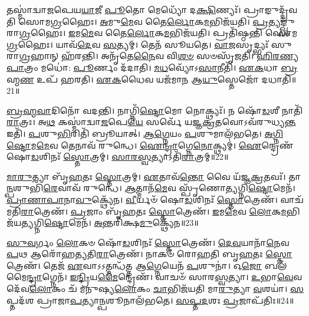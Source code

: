 𑌤𑌸𑍍𑌮𑌾॑𑌦𑍍𑌵𑌾𑌜𑌪𑍇𑌯\-\ul{𑌯𑌾}\-𑌜𑍀 \ul{𑌪𑍂}\-𑌤𑍋 𑌮𑍇𑌧𑍍𑌯𑍋᳴ 𑌦\-\ul{𑌕𑍍𑌷𑌿}\-𑌣𑍍𑌯𑌃᳴।
𑌪𑍍𑌰𑌾𑌙𑍁𑌦𑍍𑌦𑍍𑌰᳴𑌵𑌤𑌿 𑌸𑍋𑌮\-\ul{𑌗𑍍𑌰}\-𑌹𑍈𑌃।
\-\ul{𑌅}\-𑌮𑍁\-\ul{𑌮𑍇}\-𑌵 𑌤𑍈\-\ul{𑌰𑍍𑌲𑍋}\-𑌕\-\ul{𑌮}\-𑌭𑌿𑌜᳴𑌯𑌤𑌿।
\-\ul{𑌪𑍍𑌰}\-𑌤𑍍𑌯𑌙𑍍𑌖𑍍𑌸𑍁᳴𑌰𑌾\-\ul{𑌗𑍍𑌰}\-𑌹𑍈𑌃।
\-\ul{𑌇}\-𑌮\-\ul{𑌮𑍇}\-𑌵 𑌤𑍈\-\ul{𑌰𑍍𑌲𑍋}\-𑌕\-\ul{𑌮}\-𑌭𑌿𑌜᳴𑌯𑌤𑌿।
𑌪𑍍𑌰𑌤𑌿᳴\-𑌷𑍍𑌠𑌨𑍍𑌤𑌿 𑌸𑍋𑌮\-\ul{𑌗𑍍𑌰}\-𑌹𑍈𑌃।
𑌯𑌾𑌵᳴\-\ul{𑌦𑍇}\-𑌵 \ul{𑌸}\-𑌤𑍍𑌯𑌮𑍍।
𑌤𑍇𑌨᳴ 𑌸𑍂𑌯𑌤𑍇।
\-\ul{𑌵𑌾}\-\-\ul{𑌜}\-𑌸𑍃𑌦𑍍𑌭𑍍𑌯𑌃᳴ 𑌸𑍁𑌰𑌾\-\ul{𑌗𑍍𑌰}\-𑌹𑌾𑌨𑍍 𑌹᳴𑌰𑌨𑍍𑌤𑌿।
𑌅𑌨𑍃᳴𑌤𑍇\-\ul{𑌨𑍈}\-𑌵 𑌵𑌿\-\ul{𑌶}\-\-\ul{𑍞} 𑌸𑍞𑌸𑍃᳴𑌜𑌤𑌿।
\-\ul{𑌹𑌿}\-\-\ul{𑌰}\-\-\ul{𑌣𑍍𑌯}\-\-\ul{𑌪𑌾}\-𑌤𑍍𑌰𑌂 𑌮𑌧𑍋॑: \ul{𑌪𑍂}\-𑌰𑍍𑌣𑌂 𑌦᳴𑌦𑌾𑌤𑌿।
\-\ul{𑌮}\-\-\ul{𑌧}\-𑌵𑍍𑌯𑍋᳴\-𑌽\-\ul{𑌸𑌾}\-𑌨𑍀𑌤𑌿᳴।
\-\ul{𑌏}\-\-\ul{𑌕}\-𑌧𑌾 \ul{𑌬𑍍𑌰}\-𑌹𑍍𑌮\-\ul{𑌣} 𑌉𑌪᳴ 𑌹𑌰𑌤𑌿।
\-\ul{𑌏}\-\-\ul{𑌕}\-𑌧𑍈𑌵 𑌯𑌜᳴𑌮𑌾\-\ul{𑌨} 𑌆\-\ul{𑌯𑍁}\-𑌸𑍍𑌤𑍇𑌜𑍋᳴ 𑌦𑌧𑌾𑌤𑌿॥21॥\anuvakamend[\-\ul{𑌆}\-𑌪𑍍𑌤𑍍𑌵𑌾\-𑌽𑌵᳴ 𑌰𑍁\-\ul{𑌨𑍍𑌧𑍇} 𑌸𑍋\-\ul{𑌮𑌃} 𑌶𑌮᳴\-\ul{𑌲𑌂} 𑌯𑌥𑍍𑌸𑍁\-\ul{𑌰𑌾} 𑌹𑍍𑌯᳴𑌸𑍍𑌯𑍈\-\ul{𑌨𑌂} 𑌵𑍍𑌯𑌤𑌿᳴𑌷𑌜\-\ul{𑌤𑌿} 𑌵𑍍𑌯𑌾𑌵᳴𑌰𑍍𑌤𑌯𑌤𑌿 𑌸𑍃𑌜𑌤𑌿 \ul{𑌚}\-𑌤𑍍𑌵𑌾𑌰𑌿᳴ 𑌚]

\-\ul{𑌬𑍍𑌰}\-\-\ul{𑌹𑍍𑌮}\-\-\ul{𑌵𑌾}\-𑌦𑌿𑌨𑍋᳴ 𑌵𑌦𑌨𑍍𑌤𑌿।
𑌨𑌾𑌗𑍍𑌨𑌿᳴\-\ul{𑌷𑍍𑌟𑍋}\-𑌮𑍋 𑌨𑍋𑌕𑍍𑌥𑍍𑌯𑌃᳴।
𑌨 𑌷𑍋᳴\-\ul{𑌡}\-𑌶𑍀 𑌨𑌾𑌤𑌿᳴\-\ul{𑌰𑌾}\-𑌤𑍍𑌰𑌃।
𑌅\-\ul{𑌥} 𑌕𑌸𑍍𑌮𑌾॑𑌦𑍍𑌵𑌾\-\ul{𑌜}\-𑌪𑍇\-\ul{𑌯𑍇} 𑌸𑌰𑍍𑌵𑍇᳴ 𑌯𑌜𑍍𑌞\-\ul{𑌕𑍍𑌰}\-𑌤𑌵𑍋\-𑌽𑌵᳴𑌰𑍁𑌧𑍍𑌯\-\ul{𑌨𑍍𑌤} 𑌇𑌤𑌿᳴।
\-\ul{𑌪}\-𑌶𑍁\-\ul{𑌭𑌿}\-𑌰𑌿𑌤𑌿᳴ 𑌬𑍍𑌰𑍂𑌯𑌾𑌤𑍍।
\-\ul{𑌆}\-\-\ul{𑌗𑍍𑌨𑍇}\-𑌯𑌂 \ul{𑌪}\-𑌶𑍁𑌮𑌾𑌲᳴𑌭𑌤𑍇।
\-\ul{𑌅}\-\-\ul{𑌗𑍍𑌨𑌿}\-\-\ul{𑌷𑍍𑌟𑍋}\-𑌮\-\ul{𑌮𑍇}\-𑌵 𑌤𑍇𑌨𑌾𑌵᳴ 𑌰𑍁𑌨𑍍𑌧𑍇।
\-\ul{𑌐}\-\-\ul{𑌨𑍍𑌦𑍍𑌰𑌾}\-𑌗𑍍𑌨𑍇\-\ul{𑌨𑍋}\-𑌕𑍍𑌥𑍍𑌯𑌮𑍍॑।
\-\ul{𑌐}\-𑌨𑍍𑌦𑍍𑌰𑍇𑌣᳴ 𑌷𑍋\-\ul{𑌡}\-𑌶𑌿𑌨𑌃᳴ \ul{𑌸𑍍𑌤𑍋}\-𑌤𑍍𑌰𑌮𑍍।
\-\ul{𑌸𑌾}\-\-\ul{𑌰}\-\-\ul{𑌸𑍍𑌵}\-𑌤𑍍𑌯𑌾\-𑌽𑌤𑌿᳴\-\ul{𑌰𑌾}\-𑌤𑍍𑌰𑌮𑍍॥22॥

\-\ul{𑌮𑌾}\-\-\ul{𑌰𑍁}\-𑌤𑍍𑌯𑌾 𑌬𑍃᳴\-\ul{𑌹}\-𑌤𑌃 \ul{𑌸𑍍𑌤𑍋}\-𑌤𑍍𑌰𑌮𑍍।
\-\ul{𑌏}\-𑌤𑌾𑌵᳴\-\ul{𑌨𑍍𑌤𑍋} 𑌵𑍈 𑌯᳴𑌜𑍍𑌞\-\ul{𑌕𑍍𑌰}\-𑌤𑌵𑌃᳴।
𑌤𑌾\-\ul{𑌨𑍍𑌪}\-𑌶𑍁𑌭𑌿᳴\-\ul{𑌰𑍇}\-𑌵𑌾𑌵᳴ 𑌰𑍁𑌨𑍍𑌧𑍇।
\-\ul{𑌆}\-𑌤𑍍𑌮𑌾𑌨᳴\-\ul{𑌮𑍇}\-𑌵 𑌸𑍍𑌪𑍃᳴𑌣𑍋𑌤𑍍𑌯𑌗𑍍𑌨𑌿\-\ul{𑌷𑍍𑌟𑍋}\-𑌮𑍇𑌨᳴।
\-\ul{𑌪𑍍𑌰𑌾}\-\-\ul{𑌣𑌾}\-\-\ul{𑌪𑌾}\-𑌨𑌾\-\ul{𑌵𑍁}\-𑌕𑍍𑌥𑍍𑌯𑍇᳴𑌨।
\-\ul{𑌵𑍀}\-𑌰𑍍𑌯𑍞᳴ 𑌷𑍋\-\ul{𑌡}\-𑌶𑌿𑌨𑌃᳴ \ul{𑌸𑍍𑌤𑍋}\-𑌤𑍍𑌰𑍇𑌣᳴।
𑌵𑌾𑌚᳴𑌮𑌤𑌿\-\ul{𑌰𑌾}\-𑌤𑍍𑌰𑍇𑌣᳴।
\-\ul{𑌪𑍍𑌰}\-𑌜𑌾𑌂 𑌬𑍃᳴\-\ul{𑌹}\-𑌤𑌃 \ul{𑌸𑍍𑌤𑍋}\-𑌤𑍍𑌰𑍇𑌣᳴।
\-\ul{𑌇}\-𑌮\-\ul{𑌮𑍇}\-𑌵 \ul{𑌲𑍋}\-𑌕\-\ul{𑌮}\-𑌭𑌿𑌜᳴𑌯𑌤𑍍𑌯𑌗𑍍𑌨𑌿\-\ul{𑌷𑍍𑌟𑍋}\-𑌮𑍇𑌨᳴।
\-\ul{𑌅}\-𑌨𑍍𑌤𑌰𑌿᳴𑌕𑍍𑌷\-\ul{𑌮𑍁}\-𑌕𑍍𑌥𑍍𑌯𑍇᳴𑌨॥23॥

\-\ul{𑌸𑍁}\-\-\ul{𑌵}\-𑌰𑍍𑌗𑌂 \ul{𑌲𑍋}\-𑌕𑍞 𑌷𑍋᳴\-\ul{𑌡}\-𑌶𑌿𑌨𑌃᳴ \ul{𑌸𑍍𑌤𑍋}\-𑌤𑍍𑌰𑍇𑌣᳴।
\-\ul{𑌦𑍇}\-\-\ul{𑌵}\-𑌯𑌾𑌨𑌾᳴\-\ul{𑌨𑍇}\-𑌵 \ul{𑌪}\-𑌥 𑌆𑌰𑍋᳴𑌹𑌤𑍍𑌯𑌤𑌿\-\ul{𑌰𑌾}\-𑌤𑍍𑌰𑍇𑌣᳴।
𑌨𑌾𑌕𑍞᳴ 𑌰𑍋𑌹𑌤𑌿 𑌬𑍃\-\ul{𑌹}\-𑌤𑌃 \ul{𑌸𑍍𑌤𑍋}\-𑌤𑍍𑌰𑍇𑌣᳴।
𑌤𑍇𑌜᳴ \ul{𑌏}\-𑌵𑌾𑌽𑌽𑌤𑍍𑌮𑌨𑍍𑌧᳴𑌤𑍍𑌤 𑌆\-\ul{𑌗𑍍𑌨𑍇}\-𑌯𑍇𑌨᳴ \ul{𑌪}\-𑌶𑍁𑌨𑌾॑।
𑌓\-\ul{𑌜𑍋} 𑌬𑌲᳴𑌮𑍈\-\ul{𑌨𑍍𑌦𑍍𑌰𑌾}\-𑌗𑍍𑌨𑍇𑌨᳴।
\-\ul{𑌇}\-\-\ul{𑌨𑍍𑌦𑍍𑌰𑌿}\-𑌯\-\ul{𑌮𑍈}\-𑌨𑍍𑌦𑍍𑌰𑍇𑌣᳴।
𑌵𑌾𑌚𑍞᳴ 𑌸𑌾𑌰\-\ul{𑌸𑍍𑌵}\-𑌤𑍍𑌯𑌾।
\-\ul{𑌉}\-𑌭𑌾\-\ul{𑌵𑍇}\-𑌵 𑌦𑍇᳴𑌵\-\ul{𑌲𑍋}\-𑌕𑌂 𑌚᳴ 𑌮𑌨𑍁𑌷𑍍𑌯\-\ul{𑌲𑍋}\-𑌕𑌂 \ul{𑌚𑌾}\-𑌭𑌿𑌜᳴𑌯𑌤𑌿 𑌮𑌾\-\ul{𑌰𑍁}\-𑌤𑍍𑌯𑌾 \ul{𑌵}\-𑌶𑌯𑌾॑।
\-\ul{𑌸}\-𑌪𑍍𑌤𑌦᳴𑌶 𑌪𑍍𑌰𑌾𑌜𑌾\-\ul{𑌪}\-𑌤𑍍𑌯𑌾\-\ul{𑌨𑍍𑌪}\-𑌶𑍂𑌨𑌾𑌲᳴𑌭𑌤𑍇।
\-\ul{𑌸}\-\-\ul{𑌪𑍍𑌤}\-\-\ul{𑌦}\-𑌶𑌃 \ul{𑌪𑍍𑌰}\-𑌜𑌾\-𑌪᳴𑌤𑌿𑌃॥24॥

